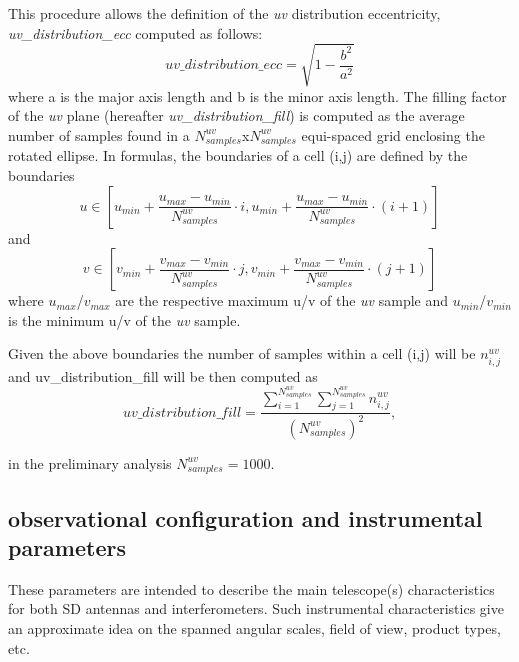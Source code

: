 \documentclass[11pt,a4paper]{ivoa}
\begin{document}
This procedure allows the definition of the \emph{uv} distribution eccentricity, \emph{uv\_distribution\_ecc} computed as follows:
\begin{equation}
uv\_distribution\_ecc = \sqrt{1-\frac{b^2}{a^2}}
\end{equation}
where a is the major axis length and b is the minor axis length.
The filling factor of the \emph{uv} plane (hereafter \emph{uv\_distribution\_fill}) is computed as the average
number of samples found in a $N^{uv}_{samples}$x$N^{uv}_{samples}$ equi-spaced grid enclosing the
rotated ellipse. In formulas, the boundaries of a cell (i,j) are defined by the boundaries
\begin{equation}
u \in [u_{min} + \frac{u_{max} - u_{min}}{N^{uv}_{samples}} \cdot i , u_{min} + \frac{u_{max} -
u_{min}}{N^{uv}_{samples}} \cdot (i + 1)]
\end{equation}
and
\begin{equation}
v \in [v_{min} + \frac{v_{max} - v_{min}}{N^{uv}_{samples}} \cdot j , v_{min} + \frac{v_{max} -
v_{min}}{N^{uv}_{samples}} \cdot (j + 1)]
\end{equation}
where $u_{max}$/$v_{max}$ are the respective maximum u/v of the \emph{uv} sample and
$u_{min}$/$v_{min}$ is the minimum u/v of the \emph{uv} sample.

Given the above boundaries the number of samples within a cell (i,j) will be $n^{uv}_{i,j}$
and uv\_distribution\_fill will be then computed as
\begin{equation}
uv\_distribution\_fill = \frac{\sum^{N^{uv}_{samples}}_{i=1} \sum^{N^{uv}_{samples}}_{j=1}
n^{uv}_{i,j} }{(N^{uv}_{samples}) ^ 2},
\end{equation}

in the preliminary analysis $N^{uv}_{samples} = 1000$.




\subsection{observational configuration and instrumental parameters}
These parameters are intended to describe the main telescope(s) characteristics for both SD antennas and interferometers. 
Such instrumental characteristics give an approximate idea on the spanned angular scales, field of view, product types, etc.
\end{document}
